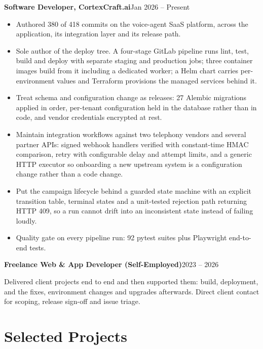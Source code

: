 \documentclass[10pt,a4paper]{article}
\newcommand{\entry}[2]{\textbf{#1}\hfill{#2}\par}
\begin{document}
\entry{Software Developer, CortexCraft.ai}{Jan 2026 -- Present}
\begin{itemize}
  \item Authored 380 of 418 commits on the voice-agent SaaS platform, across the application, its
        integration layer and its release path.
  \item Sole author of the deploy tree. A four-stage GitLab pipeline runs lint, test, build and
        deploy with separate staging and production jobs; three container images build from it
        including a dedicated worker; a Helm chart carries per-environment values and Terraform
        provisions the managed services behind it.
  \item Treat schema and configuration change as releases: 27 Alembic migrations applied in order,
        per-tenant configuration held in the database rather than in code, and vendor credentials
        encrypted at rest.
  \item Maintain integration workflows against two telephony vendors and several partner APIs:
        signed webhook handlers verified with constant-time HMAC comparison, retry with configurable
        delay and attempt limits, and a generic HTTP executor so onboarding a new upstream system is
        a configuration change rather than a code change.
  \item Put the campaign lifecycle behind a guarded state machine with an explicit transition table,
        terminal states and a unit-tested rejection path returning HTTP 409, so a run cannot drift
        into an inconsistent state instead of failing loudly.
  \item Quality gate on every pipeline run: 92 pytest suites plus Playwright end-to-end tests.
\end{itemize}

\vspace{1pt}
\entry{Freelance Web \& App Developer (Self-Employed)}{2023 -- 2026}
Delivered client projects end to end and then supported them: build, deployment, and the fixes,
environment changes and upgrades afterwards. Direct client contact for scoping, release sign-off and
issue triage.

\section{Selected Projects}
\end{document}
